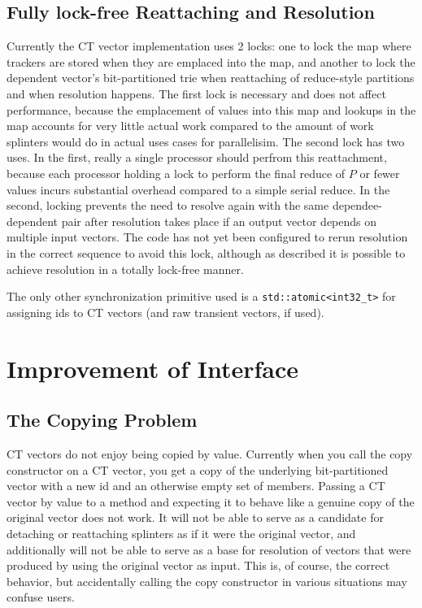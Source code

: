 \subsection{Fully lock-free Reattaching and Resolution}
Currently the CT vector implementation uses 2 locks: one to lock the map where
trackers are stored when they are emplaced into the map, and another to lock the
dependent vector's bit-partitioned trie when reattaching of reduce-style
partitions and when resolution happens. The first lock is necessary and does not
affect performance, because the emplacement of values into this map
and lookups in the map accounts for very little actual work compared to the
amount of work splinters would do in actual uses cases for parallelisim. The
second lock has two uses. In the first, really a single processor should perfrom
this reattachment, because each processor holding a lock to perform the final
reduce of $P$ or fewer values incurs substantial overhead compared to a simple
serial reduce. In the second, locking prevents the need to resolve again with
the same dependee-dependent pair after resolution takes place if an output
vector depends on multiple input vectors.  The code has not yet been configured
to rerun resolution in the correct sequence to avoid this lock, although as
described it is possible to achieve resolution in a totally
lock-free manner.

The only other synchronization primitive used is a
\texttt{std::atomic<int32\_t>} for assigning ids to CT vectors (and raw
transient vectors, if used).

\section{Improvement of Interface}

\subsection{The Copying Problem}
CT vectors do not enjoy being copied by value. Currently when you call the copy
constructor on a CT vector, you get a copy of the underlying bit-partitioned
vector with a new id and an otherwise empty set of members. Passing a CT vector
by value to a method and expecting it to behave like a genuine copy of the
original vector does not work. It will not be able to serve as a candidate for
detaching or reattaching splinters as if it were the original vector, and
additionally will not be able to serve as a base for resolution of vectors that
were produced by using the original vector as input. This is, of course, the
correct behavior, but accidentally calling the copy constructor in various
situations may confuse users.

